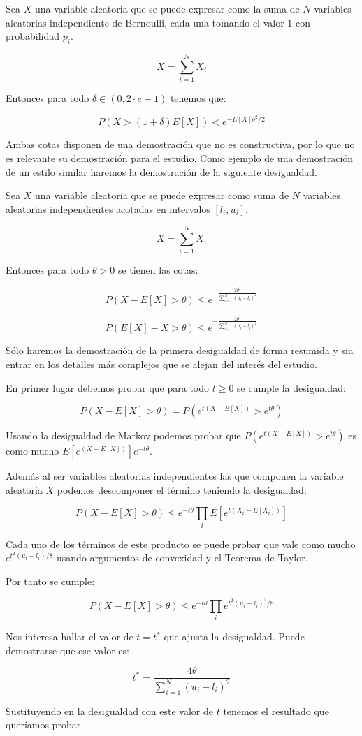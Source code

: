 \begin{teorema}
	Sea $X$ una variable aleatoria que se puede expresar como la suma de $N$ variables aleatorias independiente de Bernoulli, cada una tomando el valor $1$ con probabilidad $p_i$.
	
	$$X = \sum_{i=1}^{N}X_i$$
	
	Entonces para todo $\delta \in (0,2\cdot e -1)$ tenemos que:
	
	$$P(X>(1+\delta)E[X])<e^{-E[X]\delta^2 /2}$$
\end{teorema}

Ambas cotas disponen de una demostración que no es constructiva, por lo que no es relevante su demostración para el estudio. Como ejemplo de una demostración de un estilo similar haremos la demostración de la siguiente desigualdad.


\begin{teorema}
	Sea $X$ una variable aleatoria que se puede expresar como suma de $N$ variables aleatorias independientes acotadas en intervalos $[l_i , u_i]$.
	
	$$X = \sum_{i=1}^{N}X_i$$
	
	Entonces para todo $\theta >0$ se tienen las cotas:
	
	$$P(X - E[X] > \theta) \leq e^{- \frac{2\theta^2}{\sum_{i=1}^{N}(u_i - l_i)^2}}$$
	
	$$P(E[X] - X > \theta) \leq e^{- \frac{2\theta^2}{\sum_{i=1}^{N}(u_i - l_i)^2}}$$
\end{teorema}

\begin{demostracion}
	Sólo haremos la demostración de la primera desigualdad de forma resumida y sin entrar en los detalles más complejos que se alejan del interés del estudio.
	
	En primer lugar debemos probar que para todo $t\geq 0$ se cumple la desigualdad:
	
	$$P(X - E[X]>\theta) = P(e^{t(X - E[X])}>e^{t\theta})$$
	
	Usando la desigualdad de Markov podemos probar que $P(e^{t(X-E[X])}>e^{t\theta})$ es como mucho $E[e^{(X-E[X])}]e^{-t\theta}$.
	
	Además al ser variables aleatorias independientes las que componen la variable aleatoria $X$ podemos descomponer el término teniendo la desigualdad:
	
	$$P(X - E[X]>\theta)\leq e^{-t\theta}\prod_{i}E[e^{t(X_i - E[X_i])}]$$
	
	Cada uno de los términos de este producto se puede probar que vale como mucho $e^{t^2(u_i - l_i)/8}$ usando argumentos de convexidad y el Teorema de Taylor.
	
	Por tanto se cumple:
	
	$$P(X-E[X]>\theta)\leq e^{-t\theta}\prod_{i}e^{t^2(u_i - l_i)^2 / 8}$$
	
	Nos interesa hallar el valor de $t=t^*$ que ajusta la desigualdad. Puede demostrarse que ese valor es:
	
	$$t^* = \frac{4\theta}{\sum_{i=1}^{N}(u_i - l_i)^2}$$
	
	Sustituyendo en la desigualdad con este valor de $t$ tenemos el resultado que queríamos probar. \QEDA
\end{demostracion}
